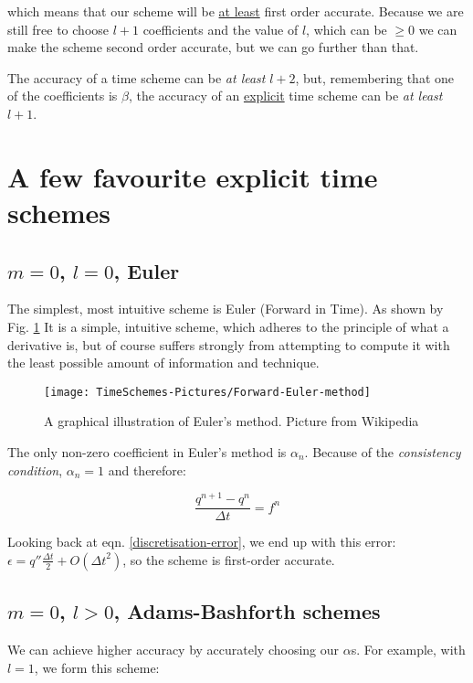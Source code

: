which means that our scheme will be \underline{at least} first order accurate. Because we are still free to choose $l+1$ coefficients and the value of $l$, which can be $\ge0$ we can make the scheme second order accurate, but we can go further than that.

	\begin{definition}		
	The accuracy of a time scheme can be \emph{at least} $l+2$, but, remembering that one of the coefficients is $\beta$, the accuracy of an \underline{explicit} time scheme can be \emph{at least} $l+1$.
	\end{definition} 

\section{A few favourite explicit time schemes}
\subsection{$m=0$, $l=0$, Euler}
The simplest, most intuitive scheme is Euler (Forward in Time). As shown by Fig. \ref{fig:Euler} It is a simple, intuitive scheme, which adheres to the principle of what a derivative is, but of course suffers strongly from attempting to compute it with the least possible amount of information and technique.

\begin{figure}[h!]
	\texttt{[image: TimeSchemes-Pictures/Forward-Euler-method]}
	\caption{A graphical illustration of Euler's method. Picture from Wikipedia}
	\label{fig:Euler}
\end{figure}

The only non-zero coefficient in Euler's method is $\alpha_n$. Because of the \emph{consistency condition}, $\alpha_n=1$ and therefore:

\begin{equation}
	\frac{q^{n+1}-q^n}{\Delta t} = f^n
	\label{Euler}
\end{equation}

Looking back at eqn. \ref{discretisation-error}, we end up with this error: $\epsilon = q''\frac{\Delta t}{2} + O({\Delta t}^2)$, so the scheme is first-order accurate. 

\subsection{$m=0$, $l>0$, Adams-Bashforth schemes}
We can achieve higher accuracy by accurately choosing our $\alpha$s. For example, with $l=1$, we form this scheme: 

